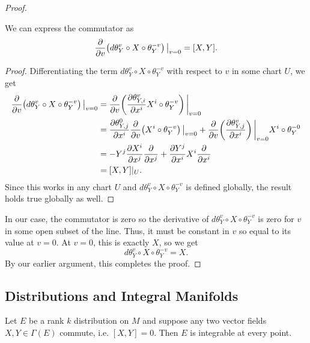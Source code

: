 \documentclass{lkx_paper}
\begin{document}
\begin{proof}
	\begin{changemargins}
		\begin{lemma*}
			We can express the commutator as
			\[
				\frac{\partial}{\partial v} \restr{\left(d\theta^v_Y \circ X \circ \theta_Y^{-v}\right)}{v=0} = [X,Y].
			\]
		\end{lemma*}
		\begin{proof}
			Differentiating the term $d\theta^v_Y \circ X \circ \theta^{-v}_Y$ with respect to $v$ in some chart $U$, we get
			\[
				\begin{aligned}
					\frac{\partial}{\partial v} \restr{\left(d\theta^v_Y \circ X \circ \theta^{-v}_Y\right)}{v=0}
					 & = \frac{\partial}{\partial v}\restr{\left(\frac{\partial \theta_{Y,i}^v}{\partial x^i}X^i\circ \theta^{-v}_{Y}\right)}{v=0}                \\
					 & = \frac{\partial \theta^0_{Y,j}}{\partial x^i}\frac{\partial}{\partial v}\restr{\left(X^i\circ \theta^{-v}_{Y}\right)}{v=0}
					+ \frac{\partial}{\partial v}\restr{\left(\frac{\partial \theta^v_{Y, j}}{\partial x^i}\right)}{v=0}X^i\circ \theta^{-0}_Y                    \\
					 & = -Y^j\frac{\partial X^i}{\partial x^j}\frac{\partial}{\partial x^j} + \frac{\partial Y^j}{\partial x^i} X^i \frac{\partial}{\partial x^i} \\
					 & = [X,Y]|_U.
				\end{aligned}
			\]
			Since this works in any chart $U$ and $d\theta^v_Y \circ X \circ \theta^{-v}_Y$ is defined globally, the result holds true globally as well.
		\end{proof}
	\end{changemargins}

	In our case, the commutator is zero so the derivative of $d\theta^v_Y \circ X \circ \theta^{-v}_Y$ is zero for $v$ in some open subset of the line. Thus, it must be constant in $v$ so equal to its value at $v=0$. At $v=0$, this is exactly $X$, so we get
	\[
		d\theta^v_Y \circ X \circ \theta^{-v}_Y = X.
	\]
	By our earlier argument, this completes the proof.
\end{proof}

\subsection*{Distributions and Integral Manifolds}

\begin{theorem*}
	Let $E$ be a rank $k$ distribution on $M$ and suppose any two vector fields $X,Y\in \Gamma(E)$ commute, i.e. $[X,Y]=0$. Then $E$ is integrable at every point.
\end{theorem*}
\end{document}
